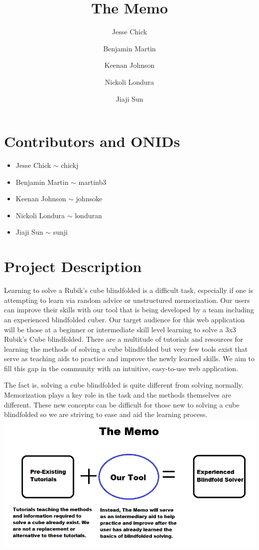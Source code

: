 \documentclass[12pt]{article}
\title{The Memo}
\author{Jesse Chick\\
\and Benjamin Martin\\
\and Keenan Johnson\\
\and Nickoli Londura\\
\and Jiaji Sun}
\begin{document}
\maketitle
\tableofcontents

\section{Contributors and ONIDs}
\begin{itemize}
	\item Jesse Chick $\sim$ chickj
	\item Benjamin Martin $\sim$ martinb3
	\item Keenan Johnson $\sim$ johnsoke
	\item Nickoli Londura $\sim$ londuran
	\item Jiaji Sun $\sim$ sunji
\end{itemize}

\section{Project Description}
\par
Learning to solve a Rubik’s cube blindfolded is a difficult task, especially if one is attempting to learn via random advice or unstructured memorization. Our users can improve their skills with our tool that is being developed by a team including an experienced blindfolded cuber. Our target audience for this web application will be those at a beginner or intermediate skill level learning to solve a 3x3 Rubik’s Cube blindfolded. There are a multitude of tutorials and resources for learning the methods of solving a cube blindfolded but very few tools exist that serve as teaching aids to practice and improve the newly learned skills. We aim to fill this gap in the community with an intuitive, easy-to-use web application. \\
\par 
The fact is, solving a cube blindfolded is quite different from solving normally. Memorization plays a key role in the task and the methods themselves are different. These new concepts can be difficult for those new to solving a cube blindfolded so we are striving to ease and aid the learning process. \\

\includegraphics[width = \textwidth]{the_memo_diagram_shit.png}
\end{document}
